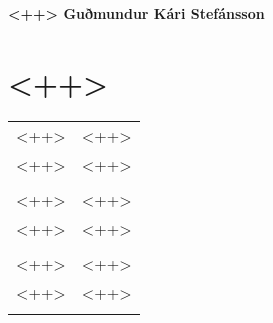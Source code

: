 \documentclass[a4paper,draft, final]{scrartcl}
\begin{document}
\textbf{<++> \hfill Guðmundur Kári Stefánsson}

\section{<++>}
\begin{tabular}{r|p{13.5cm}}
\textsc{<++>}     & <++> \\
\textsc{<++>} & \footnotesize{<++>}\\
 	\multicolumn{2}{c}{} \\
\textsc{<++>}     & <++> \\
\textsc{<++>} & \footnotesize{<++>}\\
 	\multicolumn{2}{c}{} \\
\textsc{<++>}     & <++> \\
\textsc{<++>} & \footnotesize{<++>}\\
 	\multicolumn{2}{c}{} \\

\end{tabular}
\end{document}
